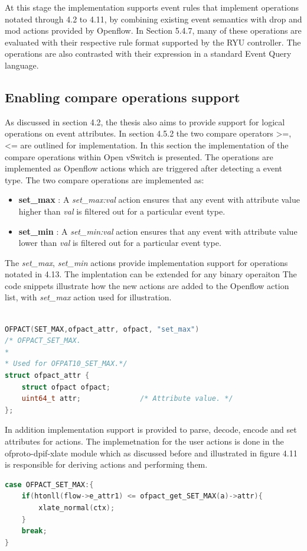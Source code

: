 At this stage the implementation supports event rules that implement operations notated through 4.2 to 4.11, by combining existing event semantics with drop and mod actions provided by Openflow. In Section 5.4.7, many of these operations are evaluated with their respective rule format supported by the RYU controller. The operations are also contrasted with their expression in a standard Event Query language.



\subsection{Enabling compare operations support}
As discussed in section 4.2, the thesis also aims to provide support for logical operations on event attributes. In section 4.5.2 the two compare operators {>=, <=} are outlined for implementation. In this section the implementation of the compare operations within Open vSwitch is presented. The operations are implemented as Openflow actions which are triggered after detecting a event type. The two compare operations are implemented as:
\begin{itemize}
	\item \textbf{set_max} : A \textit{set_max:val} action ensures that any event with attribute value higher than \textit{val} is filtered out for a particular event type.
	\item \textbf{set_min} : A \textit{set_min:val} action ensures that any event with attribute value lower than \textit{val} is filtered out for a particular event type.
\end{itemize}
The \textit{set_max}, \textit{set_min} actions provide implementation support for operations notated in 4.13. The implentation can be extended for any binary operaiton The code snippets illustrate  how the new actions are added to the Openflow action list, with \textit{set_max} action used for illustration. \newline

\begin{lstlisting}[language=c]

OFPACT(SET_MAX,ofpact_attr, ofpact, "set_max")      
/* OFPACT_SET_MAX.
*
* Used for OFPAT10_SET_MAX.*/
struct ofpact_attr {
	struct ofpact ofpact;
	uint64_t attr;              /* Attribute value. */
};
\end{lstlisting}

In addition implementation support is provided to parse, decode, encode and set attributes for actions. The implemetnation for the user actions is done in the ofproto-dpif-xlate module which as discussed before and illustrated in figure 4.11 is responsible for deriving actions and performing them. \newline
\begin{lstlisting}[language=c]
case OFPACT_SET_MAX:{        
	if(htonll(flow->e_attr1) <= ofpact_get_SET_MAX(a)->attr){
		xlate_normal(ctx);
	}
	break;    
}
\end{lstlisting}

